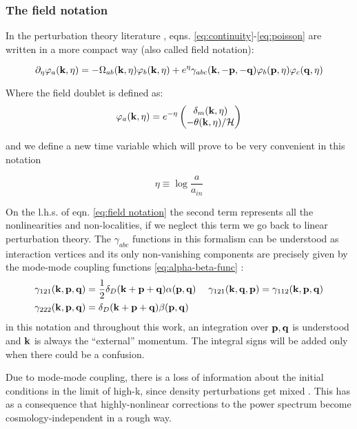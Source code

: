 \subsubsection{The field notation\label{sub:The-field-notation}}

In the perturbation theory literature \cite{bernardeau_large-scale_2001,crocce_renormalized_2005,pietroni_flowing_2008},
eqns. \ref{eq:continuity}-\ref{eq:poisson} are written in a more
compact way (also called field notation):

\begin{equation}
\partial_{\eta}\varphi_{a}(\mathbf{k},\eta)=-\Omega_{ab}(\mathbf{k},\eta)\varphi_{b}(\mathbf{k},\eta)+e^{\eta}\gamma_{abc}(\mathbf{k},\mathbf{-p},\mathbf{-q})\varphi_{b}(\mathbf{p},\eta)\varphi_{c}(\mathbf{q},\eta)\label{eq:field notation}
\end{equation}


Where the field doublet is defined as: 
\begin{equation}
\varphi_{a}(\mathbf{k},\eta)=e^{-\eta}\begin{pmatrix}\delta_{m}(\mathbf{k},\eta)\\ -\theta(\mathbf{k},\eta)/\mathcal{H} \end{pmatrix}\label{eq:field-doublet}
\end{equation}


and we define a new time variable which will prove to be very convenient
in this notation

\[
\eta\equiv\log\frac{a}{a_{in}}
\]


On the l.h.s. of eqn. \ref{eq:field notation} the second term represents
all the nonlinearities and non-localities, if we neglect this term
we go back to linear perturbation theory. The $\gamma_{abc}$ functions
in this formalism can be understood as interaction vertices and its
only non-vanishing components are precisely given by the mode-mode
coupling functions \ref{eq:alpha-beta-func} : 
\begin{align}
\gamma_{121}(\mathbf{k},\mathbf{p},\mathbf{q}) & =\frac{1}{2}\delta_{D}(\mathbf{k}+\mathbf{p}+\mathbf{q})\alpha(\mathbf{p},\mathbf{q}) & \;\gamma_{121}(\mathbf{k},\mathbf{q},\mathbf{p})=\gamma_{112}(\mathbf{k},\mathbf{p},\mathbf{q})\label{eq:coupling-vertices}\\
\gamma_{222}(\mathbf{k},\mathbf{p},\mathbf{q}) & =\delta_{D}(\mathbf{k}+\mathbf{p}+\mathbf{q})\beta(\mathbf{p},\mathbf{q})\nonumber 
\end{align}
in this notation and throughout this work, an integration over $\mathbf{p},\mathbf{q}$
is understood and $\mathbf{k}$ is always the ``external'' momentum.
The integral signs will be added only when there could be a confusion.

Due to mode-mode coupling, there is a loss of information about the
initial conditions in the limit of high-k, since density perturbations
get mixed \cite{crocce_memory_2006}. This has as a consequence that
highly-nonlinear corrections to the power spectrum become cosmology-independent
in a rough way.

